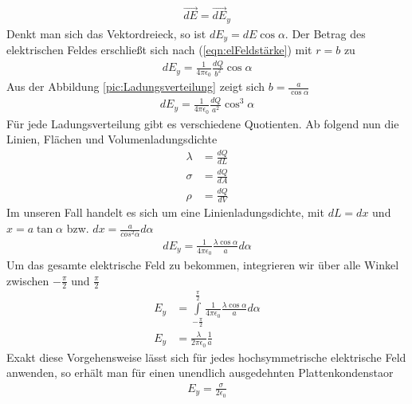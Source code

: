 \begin{align*}
\vec{dE} = \vec{dE}_y
\end{align*} Denkt man sich das Vektordreieck, so ist $dE_y = dE \cos \alpha$. Der Betrag des elektrischen Feldes erschließt sich nach (\ref{eqn:elFeldstärke}) mit $r=b$ zu\begin{align}
dE_y = \frac{1}{4\pi \epsilon_{0}} \frac{dQ}{b^2} \cos \alpha
\end{align} Aus der Abbildung \ref{pic:Ladungsverteilung} zeigt sich $b = \frac{a}{\cos \alpha}$ \begin{align*}
dE_y = \frac{1}{4\pi \epsilon_{0}} \frac{dQ}{a^2} \cos^3 \alpha
\end{align*} Für jede Ladungsverteilung gibt es verschiedene Quotienten. Ab folgend nun die Linien, Flächen und Volumenladungsdichte\begin{align}
\lambda &= \frac{dQ}{dL}\\
\sigma 	&=\frac{dQ}{dA}\\
\rho 	&=\frac{dQ}{dV}
\end{align}Im unseren Fall handelt es sich um eine Linienladungsdichte, mit $dL = dx$ und $x = a \tan \alpha$ bzw. $dx = \frac{a}{cos^2 \alpha} d\alpha$\begin{align}
dE_y = \frac{1}{4\pi \epsilon_{0}} \frac{\lambda \cos \alpha}{a} d\alpha
\end{align}Um das gesamte elektrische Feld zu bekommen, integrieren wir über alle Winkel zwischen $-\tfrac{\pi}{2}$ und $\frac{\pi}{2}$\begin{align}
E_y &= \int\limits_{-\tfrac{\pi}{2}}^{\frac{\pi}{2}} \frac{1}{4\pi \epsilon_{0}} \frac{\lambda \cos \alpha}{a} d\alpha \\
E_y &=\frac{\lambda}{2\pi \epsilon_0}\frac{1}{a}
\end{align}
Exakt diese Vorgehensweise lässt sich für jedes hochsymmetrische  elektrische Feld anwenden, so erhält man für einen unendlich ausgedehnten Plattenkondenstaor\begin{align}
E_y = \frac{\sigma}{2\epsilon_0}
\end{align}
